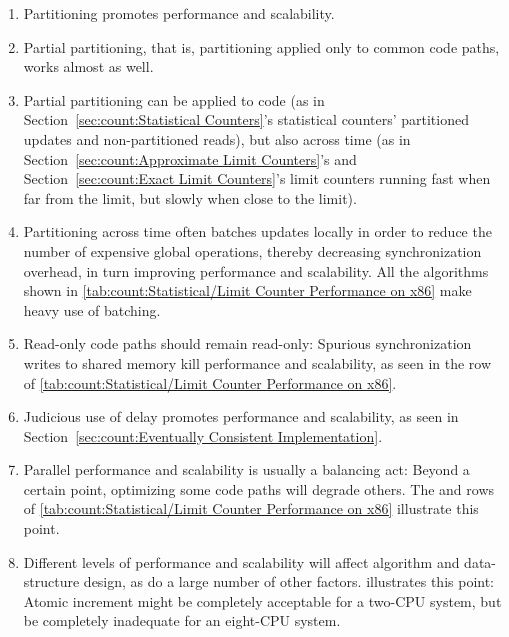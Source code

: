 \begin{enumerate}
\item	Partitioning promotes performance and scalability.
\item	Partial partitioning, that is, partitioning applied only to
	common code paths, works almost as well.
\item	Partial partitioning can be applied to code (as in
	Section~\ref{sec:count:Statistical Counters}'s statistical
	counters' partitioned updates and non-partitioned reads), but also
	across time (as in
	Section~\ref{sec:count:Approximate Limit Counters}'s and
	Section~\ref{sec:count:Exact Limit Counters}'s
	limit counters running fast when far from
	the limit, but slowly when close to the limit).
\item	Partitioning across time often batches updates locally
	in order to reduce the number of expensive global operations,
	thereby decreasing synchronization overhead, in turn
	improving performance and scalability.
	All the algorithms shown in
	\cref{tab:count:Statistical/Limit Counter Performance on x86}
	make heavy use of batching.
\item	Read-only code paths should remain read-only:  Spurious
	synchronization writes to shared memory kill performance
	and scalability, as seen in the  row of
	\cref{tab:count:Statistical/Limit Counter Performance on x86}.
\item	Judicious use of delay promotes performance and scalability, as
	seen in Section~\ref{sec:count:Eventually Consistent Implementation}.
\item	Parallel performance and scalability is usually a balancing act:
	Beyond a certain point, optimizing some code paths will degrade
	others.
	The  and  rows of
	\cref{tab:count:Statistical/Limit Counter Performance on x86}
	illustrate this point.
\item	Different levels of performance and scalability will affect
	algorithm and data-structure design, as do a large number of
	other factors.
	illustrates this point:  Atomic increment might be completely
	acceptable for a two-CPU system, but be completely inadequate for an
	eight-CPU system.
\end{enumerate}

